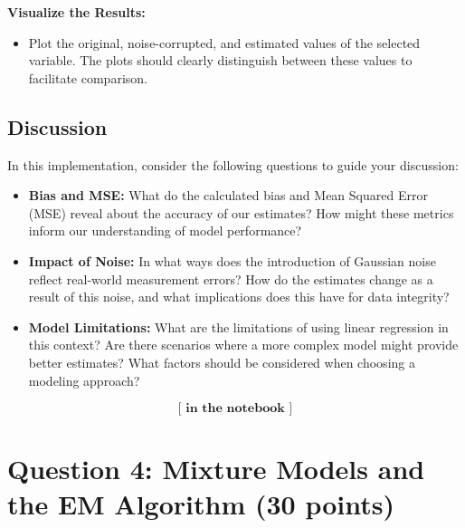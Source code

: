 \documentclass{article}
\begin{document}
\textbf{Visualize the Results:}
\begin{itemize}
    \item Plot the original, noise-corrupted, and estimated values of the selected variable. The plots should clearly distinguish between these values to facilitate comparison.
\end{itemize}

\subsection*{Discussion}
In this implementation, consider the following questions to guide your discussion:

\begin{itemize}
    \item \textbf{Bias and MSE:} What do the calculated bias and Mean Squared Error (MSE) reveal about the accuracy of our estimates? How might these metrics inform our understanding of model performance?

    \item \textbf{Impact of Noise:} In what ways does the introduction of Gaussian noise reflect real-world measurement errors? How do the estimates change as a result of this noise, and what implications does this have for data integrity?

    \item \textbf{Model Limitations:} What are the limitations of using linear regression in this context? Are there scenarios where a more complex model might provide better estimates? What factors should be considered when choosing a modeling approach?
\end{itemize}
 
\[
\textbf{[ in the notebook ]}
\]




\section*{Question 4: Mixture Models and the EM Algorithm (30 points)}
\end{document}
